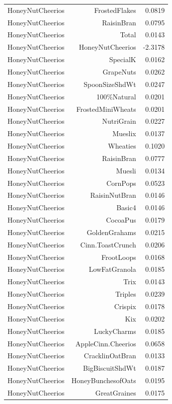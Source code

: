 \begin{longtable}{@{}lrr@{}}
HoneyNutCheerios & FrostedFlakes & 0.0819 \\
HoneyNutCheerios & RaisinBran & 0.0795 \\
HoneyNutCheerios & Total & 0.0143 \\
HoneyNutCheerios & HoneyNutCheerios & -2.3178 \\
HoneyNutCheerios & SpecialK & 0.0162 \\
HoneyNutCheerios & GrapeNuts & 0.0262 \\
HoneyNutCheerios & SpoonSizeShdWt & 0.0247 \\
HoneyNutCheerios & 100\%Natural & 0.0201 \\
HoneyNutCheerios & FrostedMiniWheats & 0.0201 \\
HoneyNutCheerios & NutriGrain & 0.0227 \\
HoneyNutCheerios & Mueslix & 0.0137 \\
HoneyNutCheerios & Wheaties & 0.1020 \\
HoneyNutCheerios & RaisinBran & 0.0777 \\
HoneyNutCheerios & Muesli & 0.0134 \\
HoneyNutCheerios & CornPops & 0.0523 \\
HoneyNutCheerios & RaisinNutBran & 0.0146 \\
HoneyNutCheerios & Basic4 & 0.0146 \\
HoneyNutCheerios & CocoaPus & 0.0179 \\
HoneyNutCheerios & GoldenGrahams & 0.0215 \\
HoneyNutCheerios & Cinn.ToastCrunch & 0.0206 \\
HoneyNutCheerios & FrootLoops & 0.0168 \\
HoneyNutCheerios & LowFatGranola & 0.0185 \\
HoneyNutCheerios & Trix & 0.0143 \\
HoneyNutCheerios & Triples & 0.0239 \\
HoneyNutCheerios & Crispix & 0.0178 \\
HoneyNutCheerios & Kix & 0.0202 \\
HoneyNutCheerios & LuckyCharms & 0.0185 \\
HoneyNutCheerios & AppleCinn.Cheerios & 0.0658 \\
HoneyNutCheerios & CracklinOatBran & 0.0133 \\
HoneyNutCheerios & BigBiscuitShdWt & 0.0187 \\
HoneyNutCheerios & HoneyBunchesofOats & 0.0195 \\
HoneyNutCheerios & GreatGraines & 0.0175 \\

\end{longtable}
